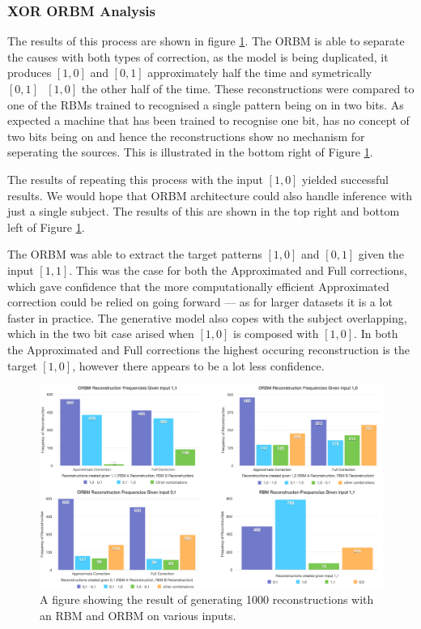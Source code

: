 \subsubsection{XOR ORBM Analysis}

The results of this process are shown in figure \ref{F:Two-Bit-RBM-Inference-Results-1}. The ORBM is able to separate the causes with both types of correction, as the model is being duplicated, it produces $[1,0]$ and $[0,1]$ approximately half the time and symetrically $[0,1]\text{ }[1,0]$ the other half of the time. These reconstructions were compared to one of the RBMs trained to recognised a single pattern being on in two bits. As expected a machine that has been trained to recognise one bit, has no concept of two bits being on and hence the reconstructions show no mechanism for seperating the sources. This is illustrated in the bottom right of Figure \ref{F:Two-Bit-RBM-Inference-Results-1}.

The results of repeating this process with the input $[1,0]$ yielded successful results. We would hope that ORBM architecture could also handle inference with just a single subject. The results of this are shown in the top right and bottom left of Figure \ref{F:Two-Bit-RBM-Inference-Results-1}.

The ORBM was able to extract the target patterns $[1,0]$ and $[0,1]$ given the input $[1,1]$. This was the case for both the Approximated and Full corrections, which gave confidence that the more computationally efficient Approximated correction could be relied on going forward --- as for larger datasets it is a lot faster in practice. The generative model also copes with the subject overlapping, which in the two bit case arised when $[1,0]$ is composed with $[1,0]$. In both the Approximated and Full corrections the highest occuring reconstruction is the target $[1,0]$, however there appears to be a lot less confidence.


\begin{landscape}
\begin{figure}
  \begin{center}
    \includegraphics[height=0.9\textheight]{Assets/results/xor-results}
  \end{center}
  \caption{A figure showing the result of generating 1000 reconstructions with an RBM and ORBM on various inputs.}
  \label{F:Two-Bit-RBM-Inference-Results-1}
\end{figure}
\end{landscape}



